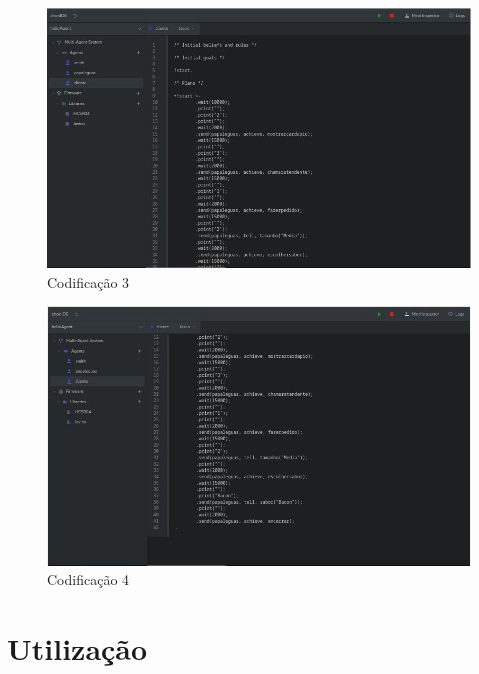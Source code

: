 \documentclass[12pt]{article}
\begin{document}
    \newpage

    \begin{figure}[!ht]
        \centering
        \includegraphics[width=1\textwidth]{figures/imagem07.jpeg}
        \caption{Codificação 3}
        \label{fig:imagem7}
    \end{figure}

    \begin{figure}[!ht]
        \centering
        \includegraphics[width=1\textwidth]{figures/imagem08.jpeg}
        \caption{Codificação 4}
        \label{fig:imagem8}
    \end{figure}
    

    \newpage 
    \vspace{10mm} 
    \section{Utilização}
\end{document}
